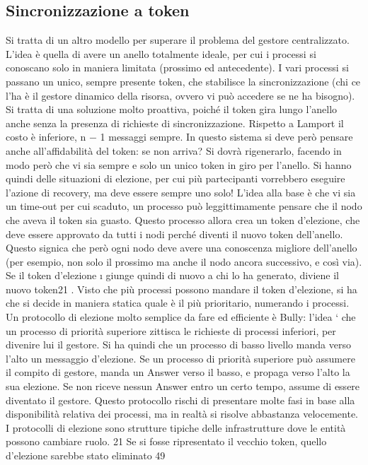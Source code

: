 \subsection{Sincronizzazione a token}
Si tratta di un altro modello per superare il problema del gestore centralizzato. L'idea è quella di avere un anello
totalmente ideale, per cui i processi si conoscano solo in maniera limitata (prossimo ed antecedente). I vari processi
si passano un unico, sempre presente token, che stabilisce la sincronizzazione (chi ce l'ha è il gestore dinamico della
risorsa, ovvero vi può accedere se ne ha bisogno). Si tratta di una soluzione molto proattiva, poiché il token gira
lungo l'anello anche senza la presenza di richieste di sincronizzazione. Rispetto
a Lamport il costo è inferiore, n $-$ 1 messaggi sempre.
In questo sistema si deve però pensare anche all'affidabilità del token: se
non arriva? Si dovrà rigenerarlo, facendo in modo però che vi sia sempre e solo
un unico token in giro per l'anello. Si hanno quindi delle situazioni di elezione,
per cui più partecipanti vorrebbero eseguire l'azione di recovery, ma deve essere
sempre uno solo! L'idea alla base è che vi sia un time-out per cui scaduto, un
processo può leggittimamente pensare che il nodo che aveva il token sia guasto.
Questo processo allora crea un token d'elezione, che deve essere approvato da
tutti i nodi perché diventi il nuovo token dell'anello. Questo signica che però
ogni nodo deve avere una conoscenza migliore dell'anello (per esempio, non solo
il prossimo ma anche il nodo ancora successivo, e così via). Se il token d'elezione
\i{}
giunge quindi di nuovo a chi lo ha generato, diviene il nuovo token21 . Visto che
più processi possono mandare il token d'elezione, si ha che si decide in maniera
statica quale è il più prioritario, numerando i processi.
Un protocollo di elezione molto semplice da fare ed efficiente è Bully: l'idea
` che un processo di priorità superiore zittisca le richieste di processi inferiori,
per divenire lui il gestore. Si ha quindi che un processo di basso livello manda
verso l'alto un messaggio d'elezione. Se un processo di priorità superiore può
assumere il compito di gestore, manda un Answer verso il basso, e propaga verso
l'alto la sua elezione. Se non riceve nessun Answer entro un certo tempo, assume
di essere diventato il gestore. Questo protocollo rischi di presentare molte fasi
in base alla disponibilità relativa dei processi, ma in realtà si risolve abbastanza
velocemente. I protocolli di elezione sono strutture tipiche delle infrastrutture
dove le entità possono cambiare ruolo.
21 Se
si fosse ripresentato il vecchio token, quello d'elezione sarebbe stato eliminato
49
